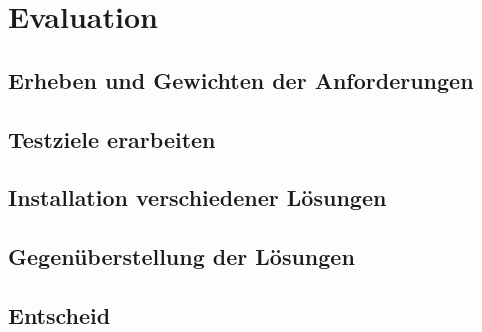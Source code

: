 
\section{Evaluation}

\subsection{Erheben und Gewichten der Anforderungen}

\subsection{Testziele erarbeiten}


\subsection{Installation verschiedener Lösungen}





\subsection{Gegenüberstellung der Lösungen}



\subsection{Entscheid}
